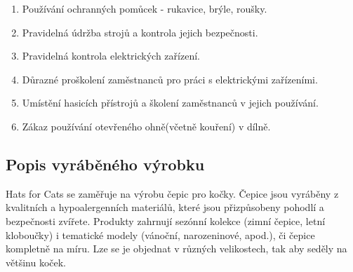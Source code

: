 \documentclass[12pt, a4paper]{article}
\begin{document}
\begin{enumerate}
  \item Používání ochranných pomůcek - rukavice, brýle, roušky.
  \item Pravidelná údržba strojů a kontrola jejich bezpečnosti.
  \item Pravidelná kontrola elektrických zařízení.
  \item Důrazné proškolení zaměstnanců pro práci s elektrickými zařízeními.
  \item Umístění hasicích přístrojů a školení zaměstnanců v jejich používání.
  \item Zákaz používání otevřeného ohně(včetně kouření) v dílně.
\end{enumerate}

\pagebreak

\subsection{Popis vyráběného výrobku}

Hats for Cats se zaměřuje na výrobu čepic pro kočky. Čepice jsou vyráběny 
z kvalitních a hypoalergenních materiálů, které jsou přizpůsobeny pohodlí a bezpečnosti zvířete.
Produkty zahrnují sezónní kolekce (zimní čepice, letní kloboučky) i tematické modely (vánoční, narozeninové, apod.),
či čepice kompletně na míru. Lze se je objednat v různých velikostech, tak aby seděly na většinu koček.
\end{document}
